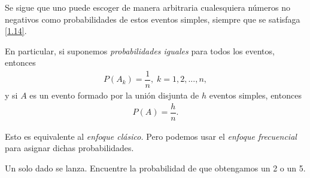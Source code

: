 {}
Se sigue que uno puede escoger de manera arbitraria cualesquiera números no negativos como probabilidades de estos eventos simples, siempre que se satisfaga \eqref{1.14}. 

En particular, si suponemos \emph{probabilidades iguales} para todos los eventos, entonces
\begin{align}
 \label{eq:0.1.15}
 P(A_{k})=\dfrac{1}{n}, \; k=1,2,...,n,
\end{align}
y si $A$ es un evento formado por la unión disjunta de $h$ eventos simples, entonces
\begin{align}
	\label{eq:0.1.16}
 P(A)=\dfrac{h}{n}.
\end{align}


{}
\begin{rem}
 Esto es equivalente al \textit{enfoque clásico.} Pero podemos usar el \textit{enfoque frecuencial} para asignar dichas probabilidades.
\end{rem}


{}
\begin{ejemplo}
 \label{exmp:0.1.12}
 Un solo dado se lanza. Encuentre la probabilidad de que obtengamos un 2 o un 5.
\end{ejemplo}



